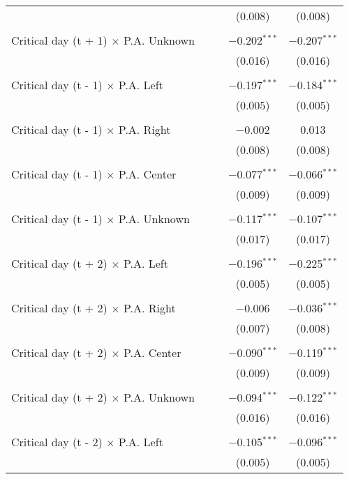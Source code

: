 \documentclass[
]{article}
\begin{document}
\begin{table}[!htbp]
{\begin{tabular}{@{\extracolsep{5pt}}lcccc}
  &  &  & (0.008) & (0.008) \\ 
  & & & & \\ 
 Critical day (t + 1) $\times$ P.A. Unknown &  &  & $-$0.202$^{***}$ & $-$0.207$^{***}$ \\ 
  &  &  & (0.016) & (0.016) \\ 
  & & & & \\ 
 Critical day (t - 1) $\times$ P.A. Left &  &  & $-$0.197$^{***}$ & $-$0.184$^{***}$ \\ 
  &  &  & (0.005) & (0.005) \\ 
  & & & & \\ 
 Critical day (t - 1) $\times$ P.A. Right &  &  & $-$0.002 & 0.013 \\ 
  &  &  & (0.008) & (0.008) \\ 
  & & & & \\ 
 Critical day (t - 1) $\times$ P.A. Center &  &  & $-$0.077$^{***}$ & $-$0.066$^{***}$ \\ 
  &  &  & (0.009) & (0.009) \\ 
  & & & & \\ 
 Critical day (t - 1) $\times$ P.A. Unknown &  &  & $-$0.117$^{***}$ & $-$0.107$^{***}$ \\ 
  &  &  & (0.017) & (0.017) \\ 
  & & & & \\ 
 Critical day (t + 2) $\times$ P.A. Left &  &  & $-$0.196$^{***}$ & $-$0.225$^{***}$ \\ 
  &  &  & (0.005) & (0.005) \\ 
  & & & & \\ 
 Critical day (t + 2) $\times$ P.A. Right &  &  & $-$0.006 & $-$0.036$^{***}$ \\ 
  &  &  & (0.007) & (0.008) \\ 
  & & & & \\ 
 Critical day (t + 2) $\times$ P.A. Center &  &  & $-$0.090$^{***}$ & $-$0.119$^{***}$ \\ 
  &  &  & (0.009) & (0.009) \\ 
  & & & & \\ 
 Critical day (t + 2) $\times$ P.A. Unknown &  &  & $-$0.094$^{***}$ & $-$0.122$^{***}$ \\ 
  &  &  & (0.016) & (0.016) \\ 
  & & & & \\ 
 Critical day (t - 2) $\times$ P.A. Left &  &  & $-$0.105$^{***}$ & $-$0.096$^{***}$ \\ 
  &  &  & (0.005) & (0.005) \\ 

\end{tabular}}
\end{table}
\end{document}
